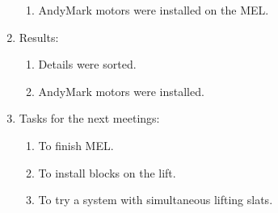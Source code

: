 \begin{enumerate}
\begin{enumerate}
        \item AndyMark motors were installed on the MEL.
	\end{enumerate}   
	
	\item Results:
	\begin{enumerate}
		
		\item Details were sorted.
		
		\item AndyMark motors were installed.
		
	\end{enumerate}
	
	\item Tasks for the next meetings:
	\begin{enumerate}
		
		\item To finish MEL.
		
		\item To install blocks on the lift.
		
        \item To try a system with simultaneous lifting slats.
			
	\end{enumerate}
\end{enumerate}
\fillpage
